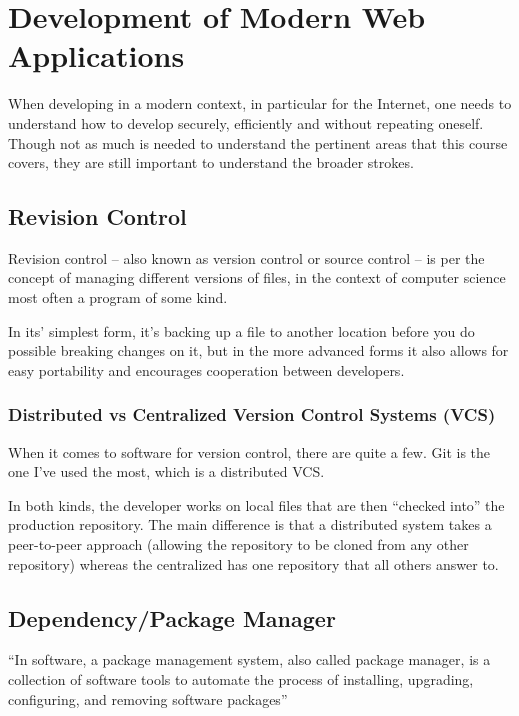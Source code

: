 \chapter{Development of Modern Web Applications}
\label{ch:theory}
\noindent
When developing in a modern context, in particular for the Internet, one needs to
understand how to develop securely, efficiently and without repeating oneself. Though not as much is needed to understand the pertinent areas that this course covers, they are still important to understand the broader strokes.

\section{Revision Control}
\label{sec:revisioncontrol}
\noindent
Revision control -- also known as version control or source control -- is per \citep{Wikipedia2013rc} the concept of managing different versions of files, in the context of computer science most often a program of some kind.

In its' simplest form, it's backing up a file to another location before you do possible breaking changes on it, but in the more advanced forms it also allows for easy portability and encourages cooperation between developers.

\subsection{Distributed vs Centralized Version Control Systems (VCS)}
\noindent
When it comes to software for version control, there are quite a few. Git \citep{Git} is the one I've used the most, which is a distributed VCS.

In both kinds, the developer works on local files that are then ``checked into'' the production repository. The main difference is that a distributed system takes a peer-to-peer approach (allowing the repository to be cloned from any other repository) whereas the centralized has one repository that all others answer to.

\section{Dependency/Package Manager}
\label{sec:packagemanager}
\noindent
``In software, a package management system, also called package manager, is a collection of software tools to automate the process of installing, upgrading, configuring, and removing software packages''\citep{Wikipedia2013pms}

